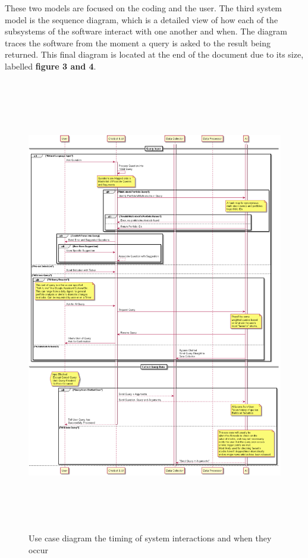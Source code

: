 \documentclass[]{IEEEtran}
\begin{document}
	These two models are focused on the coding and the user. The third system model is the sequence diagram, which is a detailed view of how each of the subsystems of the software interact with one another and when. The diagram traces the software from the moment a query is asked to the result being returned. This final diagram is located at the end of the document due to its size, labelled \textbf{figure 3 and 4}.
	
	\begin{figure}[h]
		\includegraphics[width=\textwidth, height = 20cm]{sequence}
		\caption{Use case diagram the timing of system interactions and when they occur}
	\end{figure}
	
\end{document}
